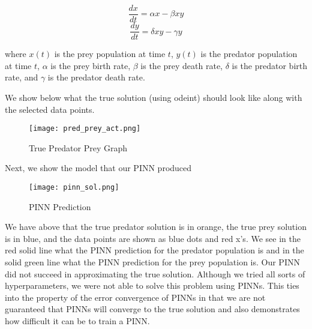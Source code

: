 \documentclass{article}
\begin{document}
$$\frac{dx}{dt} = \alpha x - \beta x y$$
$$\frac{dy}{dt} = \delta xy - \gamma y$$

where $x(t)$ is the prey population at time $t$, $y(t)$ is the predator population at time $t$, $\alpha$ is the prey birth rate, $\beta$ is the prey death rate, $\delta$ is the predator birth rate, and $\gamma$ is the predator death rate.

We show below what the true solution (using odeint) should look like along with the selected data points.

\begin{figure}[H]
    \centering
    \texttt{[image: pred\_prey\_act.png]}
    \caption{True Predator Prey Graph}
\end{figure}

Next, we show the model that our PINN produced

\begin{figure}[H]
    \centering
    \texttt{[image: pinn\_sol.png]}
    \caption{PINN Prediction}
\end{figure}

We have above that the true predator solution is in orange, the true prey solution is in blue, and the data points are shown as blue dots and red x's. We see in the red solid line what the PINN prediction for the predator population is and in the solid green line what the PINN prediction for the prey population is. Our PINN did not succeed in approximating the true solution. Although we tried all sorts of hyperparameters, we were not able to solve this problem using PINNs. This ties into the property of the error convergence of PINNs in that we are not guaranteed that PINNs will converge to the true solution and also demonstrates how difficult it can be to train a PINN.


\end{document}
